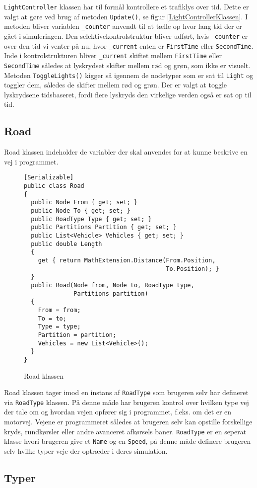 \texttt{LightController} klassen har til formål kontrollere et trafiklys over tid. Dette er valgt at gøre ved brug af metoden \texttt{Update()}, se figur \ref{LightControllerKlassen}. I metoden bliver variablen \texttt{\_counter} anvendt til at tælle op hvor lang tid der er gået i simuleringen. Den selektivekontrolstruktur bliver udført, hvis \texttt{\_counter} er over den tid vi venter på nu, hvor \texttt{\_current} enten er \texttt{FirstTime} eller \texttt{SecondTime}. Inde i kontrolstrukturen bliver \texttt{\_current} skiftet mellem \texttt{FirstTime} eller \texttt{SecondTime} således at lyskrydset skifter mellem rød og grøn, som ikke er visuelt. Metoden \texttt{ToggleLights()} kigger så igennem de nodetyper som er sat til \texttt{Light} og toggler dem, således de skifter mellem rød og grøn. Der er valgt at toggle lyskrydsene tidsbaseret, fordi flere lyskryds den virkelige verden også er sat op til tid.

\subsection{Road}
Road klassen indeholder de variabler der skal anvendes for at kunne beskrive en vej i programmet.

\begin{figure}[H]
\begin{lstlisting}
[Serializable]
public class Road
{
  public Node From { get; set; }
  public Node To { get; set; }
  public RoadType Type { get; set; }
  public Partitions Partition { get; set; }
  public List<Vehicle> Vehicles { get; set; }
  public double Length
  {
    get { return MathExtension.Distance(From.Position, 
                                        To.Position); }
  }   
  public Road(Node from, Node to, RoadType type, 
              Partitions partition)
  {
    From = from;
    To = to;
    Type = type;
    Partition = partition;
    Vehicles = new List<Vehicle>();
  }
}
\end{lstlisting}
\caption{Road klassen}\label{RoadKlassen}
\end{figure}

Road klassen tager imod en instans af \texttt{RoadType} som brugeren selv har defineret via \texttt{RoadType} klassen. På denne måde har brugeren kontrol over hvilken type vej der tale om og hvordan vejen opfører sig i programmet, f.eks. om det er en motorvej. Vejene er programmeret således at brugeren selv kan opstille forskellige kryds, rundkørsler eller andre avanceret afkørsels baner. \texttt{RoadType} er en seperat klasse hvori brugeren give et \texttt{Name} og en \texttt{Speed}, på denne måde definere brugeren selv hvilke typer veje der optræder i deres simulation.

\subsection{Typer}
